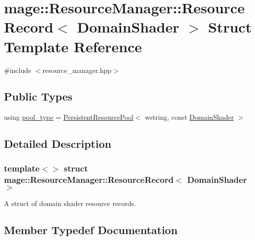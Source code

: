 \hypertarget{structmage_1_1_resource_manager_1_1_resource_record_3_01_domain_shader_01_4}{}\section{mage\+:\+:Resource\+Manager\+:\+:Resource\+Record$<$ Domain\+Shader $>$ Struct Template Reference}
\label{structmage_1_1_resource_manager_1_1_resource_record_3_01_domain_shader_01_4}


{\ttfamily \#include $<$resource\+\_\+manager.\+hpp$>$}

\subsection*{Public Types}
\begin{DoxyCompactItemize}
\item 
using \hyperlink{structmage_1_1_resource_manager_1_1_resource_record_3_01_domain_shader_01_4_a78612efb53dce63bf8d8b33e6b9c1207}{pool\+\_\+type} = \hyperlink{classmage_1_1_persistent_resource_pool}{Persistent\+Resource\+Pool}$<$ wstring, const \hyperlink{namespacemage_aef8cda73e2387cb89baa6c54a7fea542}{Domain\+Shader} $>$
\end{DoxyCompactItemize}


\subsection{Detailed Description}
\subsubsection*{template$<$$>$\newline
struct mage\+::\+Resource\+Manager\+::\+Resource\+Record$<$ Domain\+Shader $>$}

A struct of domain shader resource records. 

\subsection{Member Typedef Documentation}
\hypertarget{structmage_1_1_resource_manager_1_1_resource_record_3_01_domain_shader_01_4_a78612efb53dce63bf8d8b33e6b9c1207}{}\label{structmage_1_1_resource_manager_1_1_resource_record_3_01_domain_shader_01_4_a78612efb53dce63bf8d8b33e6b9c1207} 

